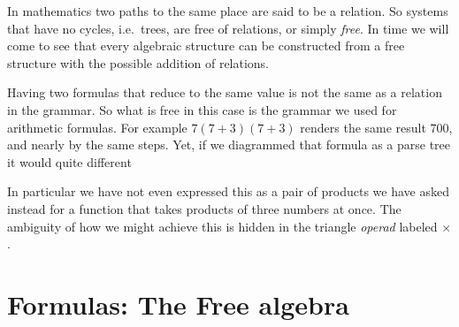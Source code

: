 
In mathematics two paths to the same place are said to be a relation.  So
systems that have no cycles, i.e.\ trees, are free of relations, or simply
\emph{free}.  In time we will come to see that every algebraic structure can be
constructed from a free structure with the possible addition of relations.

\begin{remark}{}
    Having two formulas that reduce to the same value is not the same 
as a relation in the grammar.  So what is free in this case 
is the grammar we used for arithmetic formulas.  
For example $7(7+3)(7+3)$ renders the same result 700, and nearly 
by the same steps.  Yet, if we diagrammed that formula as a
parse tree it would quite different
\begin{center}
\end{center}    
In particular we have not even expressed this as a pair of products 
we have asked instead for a function that takes products of three 
numbers at once.  The ambiguity of how we might achieve this is hidden in the 
triangle \emph{operad} labeled $\times$.
\end{remark}

\section{Formulas: The Free algebra}

